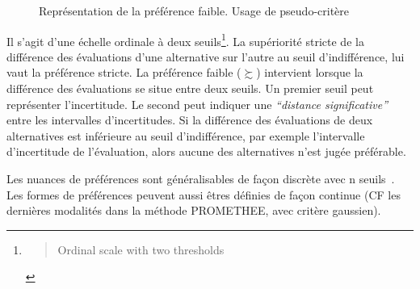 \begin{figure}
\centering
{}
\caption{Représentation de la préférence faible. Usage de pseudo-critère}
\label{fig:weak_pref}
\end{figure}
Il s'agit d'une échelle ordinale à deux seuils\footnote{\blockcquote[section 3.7.1.2]{bouyssou_evaluation_2006}{Ordinal scale with two thresholds}}.
La supériorité stricte de la différence des évaluations d'une alternative sur l'autre au seuil d'indifférence, lui vaut la préférence stricte.
La préférence faible ($\succsim$) intervient lorsque la différence des évaluations se situe entre deux seuils.
Un premier seuil peut représenter l'incertitude.
Le second peut indiquer une \emph{``distance significative''} entre les intervalles d'incertitudes.
Si la différence des évaluations de deux alternatives est inférieure au seuil d'indifférence, par exemple l'intervalle d'incertitude de l'évaluation, alors aucune des alternatives n'est jugée préférable.

Les nuances de préférences sont généralisables de façon discrète avec n seuils~\cite[3.7.1.4 Ordinal scale with k thresholds]{bouyssou_evaluation_2006}.
Les formes de préférences peuvent aussi êtres définies de façon continue (CF les dernières modalités
dans la méthode \gls{PROMETHEE}, avec critère gaussien).

%
%
%
%
%
%

